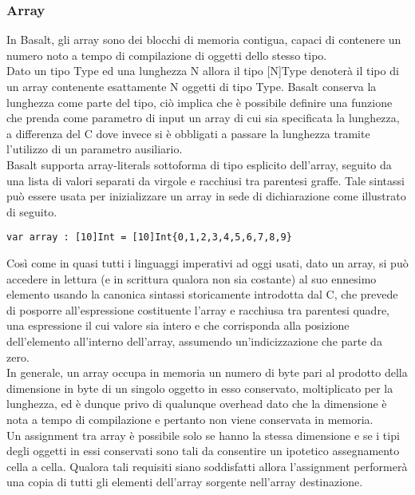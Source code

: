\subsubsection{Array}
In Basalt, gli array sono dei blocchi di memoria contigua, capaci di contenere un numero noto a tempo di compilazione di oggetti dello stesso tipo. \\

Dato un tipo Type ed una lunghezza N allora il tipo [N]Type denoterà il tipo di un array contenente esattamente  N oggetti di tipo Type. Basalt 
conserva la lunghezza come parte del tipo, ciò implica che è possibile definire una funzione che prenda come parametro di input un array di cui 
sia specificata la lunghezza, a differenza del C dove invece si è obbligati a passare la lunghezza tramite l’utilizzo di un parametro ausiliario.  \\

Basalt supporta array-literals sottoforma di tipo esplicito dell’array, seguito da una lista di valori separati 
da virgole e racchiusi tra parentesi graffe. Tale sintassi può essere usata per inizializzare un array in 
sede di dichiarazione come illustrato di seguito. \\

\vspace{0.5cm}
\begin{lstlisting}[frame=single]
var array : [10]Int = [10]Int{0,1,2,3,4,5,6,7,8,9}
\end{lstlisting}
\vspace{0.5cm}

Così come in quasi tutti i linguaggi imperativi ad oggi usati, dato un array, si può accedere in lettura (e in scrittura qualora non sia costante) 
al suo ennesimo elemento usando la canonica sintassi storicamente introdotta dal C, che prevede 
di posporre all’espressione costituente l’array e racchiusa tra parentesi quadre, una espressione il cui valore sia intero e che 
corrisponda alla posizione dell’elemento all’interno dell’array, assumendo un’indicizzazione che parte da zero. \\

In generale, un array occupa in memoria un numero di byte pari al prodotto della dimensione 
in byte di un singolo oggetto in esso conservato, moltiplicato per la lunghezza, ed è dunque privo di qualunque overhead 
dato che la dimensione è nota a tempo di compilazione e pertanto non viene conservata in memoria. \\

Un assignment tra array è possibile solo se hanno la stessa dimensione e se i tipi 
degli oggetti in essi conservati sono tali da consentire un ipotetico assegnamento cella a cella. Qualora tali 
requisiti siano soddisfatti allora l’assignment performerà una copia di tutti gli elementi dell’array sorgente nell’array destinazione.